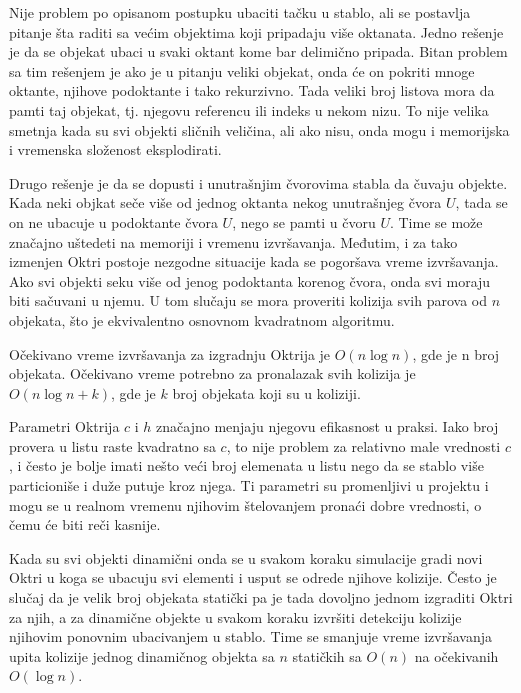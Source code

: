 \documentclass[12pt,oneside]{memoir}
\begin{document}
Nije problem po opisanom postupku ubaciti tačku u stablo, ali se postavlja pitanje šta raditi sa većim objektima
koji pripadaju više oktanata.
Jedno rešenje je da se objekat ubaci u svaki oktant kome bar delimično pripada. 
Bitan problem sa tim rešenjem je ako je u pitanju veliki objekat, onda će on pokriti mnoge oktante, njihove 
podoktante i tako rekurzivno. Tada veliki broj listova mora da pamti taj objekat, tj. njegovu referencu ili indeks u nekom nizu.
To nije velika smetnja kada su svi objekti sličnih veličina, ali ako 
nisu, onda mogu i memorijska i vremenska složenost eksplodirati. 

Drugo rešenje je da se dopusti i unutrašnjim čvorovima stabla da čuvaju objekte.
Kada neki objkat seče više od jednog oktanta nekog unutrašnjeg čvora $U$, tada se on ne ubacuje 
u podoktante čvora $U$, nego se pamti u čvoru $U$. Time se može značajno uštedeti na memoriji i vremenu izvršavanja.
Međutim, i za tako izmenjen Oktri postoje nezgodne situacije kada se pogoršava vreme izvršavanja.
Ako svi objekti seku više od jenog podoktanta korenog čvora, onda svi moraju biti sačuvani u njemu. 
U tom slučaju se mora proveriti kolizija svih parova od $n$ objekata, što je ekvivalentno osnovnom kvadratnom algoritmu.

Očekivano vreme izvršavanja za izgradnju Oktrija je $O(n \log n)$, gde je n broj objekata.
Očekivano vreme potrebno za pronalazak svih kolizija je $O(n \log n + k)$, gde je $k$ broj objekata koji su u koliziji.

Parametri Oktrija $c$ i $h$ značajno menjaju njegovu efikasnost u praksi. 
Iako broj provera u listu raste kvadratno sa $c$, to nije problem za relativno male vrednosti $c$, i često je bolje 
imati nešto veći broj elemenata u listu nego da se stablo više particioniše i duže putuje kroz njega.
Ti parametri su promenljivi u projektu i mogu se u realnom vremenu njihovim štelovanjem pronaći 
dobre vrednosti, o čemu će biti reči kasnije.

Kada su svi objekti dinamični onda se u svakom koraku simulacije  gradi novi Oktri u
koga se ubacuju svi elementi i usput se odrede njihove kolizije. Često je slučaj da je velik 
broj objekata statički pa je tada dovoljno jednom izgraditi Oktri za njih, a za dinamične objekte u svakom koraku 
izvršiti detekciju kolizije njihovim ponovnim ubacivanjem u stablo. Time se smanjuje vreme izvršavanja upita 
kolizije jednog dinamičnog objekta sa $n$ statičkih sa $O(n)$ na očekivanih $O(\log n)$.
\end{document}
